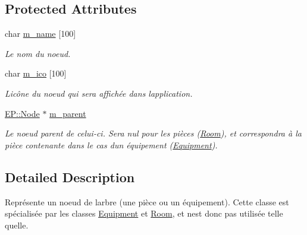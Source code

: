 \subsection*{Protected Attributes}
\begin{DoxyCompactItemize}
\item 
char \hyperlink{class_e_p_1_1_node_a31312ed65b64cb081b4cbdf0acffa44f}{m\+\_\+name} \mbox{[}100\mbox{]}\hypertarget{class_e_p_1_1_node_a31312ed65b64cb081b4cbdf0acffa44f}{}\label{class_e_p_1_1_node_a31312ed65b64cb081b4cbdf0acffa44f}

\begin{DoxyCompactList}\small\item\em Le nom du noeud. \end{DoxyCompactList}\item 
char \hyperlink{class_e_p_1_1_node_a149cce768568286687e756c1f9dce2b4}{m\+\_\+ico} \mbox{[}100\mbox{]}\hypertarget{class_e_p_1_1_node_a149cce768568286687e756c1f9dce2b4}{}\label{class_e_p_1_1_node_a149cce768568286687e756c1f9dce2b4}

\begin{DoxyCompactList}\small\item\em L\textquotesingle{}icône du noeud qui sera affichée dans l\textquotesingle{}application. \end{DoxyCompactList}\item 
\hyperlink{class_e_p_1_1_node}{E\+P\+::\+Node} $\ast$ \hyperlink{class_e_p_1_1_node_ac61ce03b473134cb3cd4fcf33acc03f6}{m\+\_\+parent}\hypertarget{class_e_p_1_1_node_ac61ce03b473134cb3cd4fcf33acc03f6}{}\label{class_e_p_1_1_node_ac61ce03b473134cb3cd4fcf33acc03f6}

\begin{DoxyCompactList}\small\item\em Le noeud parent de celui-\/ci. Sera nul pour les pièces (\hyperlink{class_e_p_1_1_room}{Room}), et correspondra à la pièce contenante dans le cas d\textquotesingle{}un équipement (\hyperlink{class_e_p_1_1_equipment}{Equipment}). \end{DoxyCompactList}\end{DoxyCompactItemize}


\subsection{Detailed Description}
Représente un noeud de l\textquotesingle{}arbre (une pièce ou un équipement). Cette classe est spécialisée par les classes \hyperlink{class_e_p_1_1_equipment}{Equipment} et \hyperlink{class_e_p_1_1_room}{Room}, et n\textquotesingle{}est donc pas utilisée telle qu\textquotesingle{}elle. 

